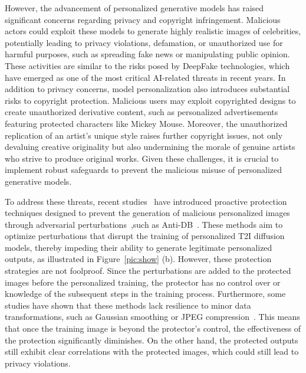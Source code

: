 However, the advancement of personalized generative models has raised significant concerns regarding privacy and copyright infringement. Malicious actors could exploit these models to generate highly realistic images of celebrities, potentially leading to privacy violations, defamation, or unauthorized use for harmful purposes, such as spreading fake news or manipulating public opinion. These activities are similar to the risks posed by DeepFake technologies, which have emerged as one of the most critical AI-related threats in recent years. In addition to privacy concerns, model personalization also introduces substantial risks to copyright protection. Malicious users may exploit copyrighted designs to create unauthorized derivative content, such as personalized advertisements featuring protected characters like Mickey Mouse. Moreover, the unauthorized replication of an artist's unique style raises further copyright issues, not only devaluing creative originality but also undermining the morale of genuine artists who strive to produce original works. Given these challenges, it is crucial to implement robust safeguards to prevent the malicious misuse of personalized generative models.


To address these threats, recent studies~\cite{van2023anti,ye2023duaw, wang2024simac, yang2024ddap, liu2024disrupting} have introduced proactive protection techniques designed to prevent the generation of malicious personalized images through adversarial perturbations~\cite{liang2023adversarial, liu2022watermark},such as Anti-DB~\cite{van2023anti}. These methods aim to optimize perturbations that disrupt the training of personalized T2I diffusion models, thereby impeding their ability to generate legitimate personalized outputs, as illustrated in Figure~\ref{pic:show} (b). However, these protection strategies are not foolproof. Since the perturbations are added to the protected images before the personalized training, the protector has no control over or knowledge of the subsequent steps in the training process. Furthermore, some studies have shown that these methods lack resilience to minor data transformations, such as Gaussian smoothing or JPEG compression~\cite{ye2023duaw}. This means that once the training image is beyond the protector's control, the effectiveness of the protection significantly diminishes. On the other hand, the protected outputs still exhibit clear correlations with the protected images, which could still lead to privacy violations.

